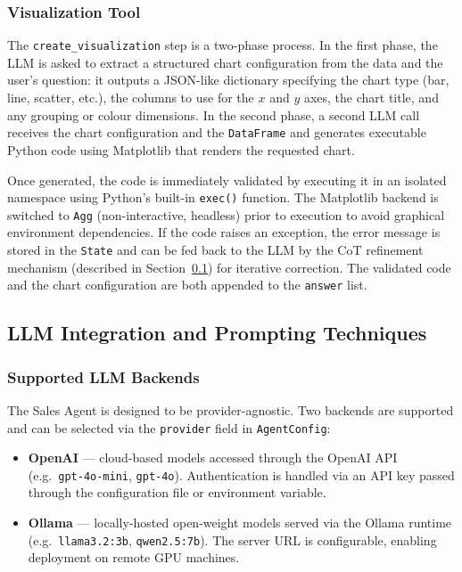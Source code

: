 \subsubsection{Visualization Tool}

The \texttt{create\_visualization} step is a two-phase process. In the first phase,
the LLM is asked to extract a structured chart configuration from the data and the
user's question: it outputs a JSON-like dictionary specifying the chart type (bar,
line, scatter, etc.), the columns to use for the $x$ and $y$ axes, the chart title,
and any grouping or colour dimensions. In the second phase, a second LLM call
receives the chart configuration and the \texttt{DataFrame} and generates executable
Python code using Matplotlib that renders the requested chart.

Once generated, the code is immediately validated by executing it in an isolated
namespace using Python's built-in \texttt{exec()} function. The Matplotlib backend
is switched to \texttt{Agg} (non-interactive, headless) prior to execution to avoid
graphical environment dependencies. If the code raises an exception, the error
message is stored in the \texttt{State} and can be fed back to the LLM by the CoT
refinement mechanism (described in Section~\ref{subsec:prompting}) for iterative
correction. The validated code and the chart configuration are both appended to the
\texttt{answer} list.

\subsection{LLM Integration and Prompting Techniques}
\label{subsec:prompting}

\subsubsection{Supported LLM Backends}

The Sales Agent is designed to be provider-agnostic. Two backends are supported and
can be selected via the \texttt{provider} field in \texttt{AgentConfig}:

\begin{itemize}
    \item \textbf{OpenAI} — cloud-based models accessed through the OpenAI API
          (e.g.\ \texttt{gpt-4o-mini}, \texttt{gpt-4o}). Authentication is handled
          via an API key passed through the configuration file or environment variable.
    \item \textbf{Ollama} — locally-hosted open-weight models served via the Ollama
          runtime (e.g.\ \texttt{llama3.2:3b}, \texttt{qwen2.5:7b}). The server URL
          is configurable, enabling deployment on remote GPU machines.
\end{itemize}


